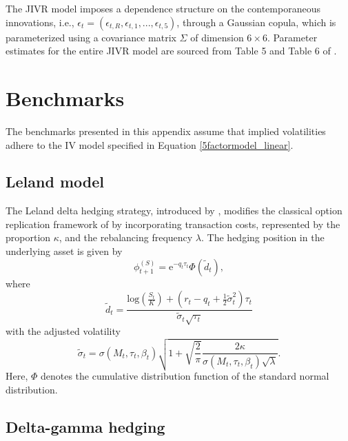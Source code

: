 \documentclass[12pt]{article}
\begin{document}
The JIVR model imposes a dependence structure on the contemporaneous innovations, i.e., \(\epsilon_t = (\epsilon_{t,R}, \epsilon_{t,1}, ..., \epsilon_{t,5})\), through a Gaussian copula, which is parameterized using a covariance matrix \(\Sigma\) of dimension \(6 \times 6\). Parameter estimates for the entire JIVR model are sourced from Table 5 and Table 6 of \cite{Frnacois2023}.

\section{Benchmarks}\label{appen:benchmarks}

The benchmarks presented in this appendix assume that implied volatilities adhere to the IV model specified in Equation \eqref{5factormodel_linear}.

\subsection{Leland model}\label{appen:Leland_model}

The Leland delta hedging strategy, introduced by \cite{Leland}, modifies the classical option replication framework of \cite{BlackScholes} by incorporating transaction costs, represented by the proportion $\kappa$, and the rebalancing frequency $\lambda$. The hedging position in the underlying asset is given by
\begin{equation*}
   \phi^{(S)}_{t+1} = \mbox{e}^{-q_{t}\tau_{t}}\Phi\left(\tilde{d}_{t} \right),
\end{equation*}
where
\begin{equation*}
\tilde{d}_{t} = \frac{\mbox{log}\left( \frac{S_{t}}{K} \right)+\left( r_{t}-q_{t}+\frac{1}{2}\tilde{\sigma}_{t}^2 \right)\tau_{t}}{\tilde{\sigma}_{t} \sqrt{\tau_{t}}}
\end{equation*}
with the adjusted volatility
\begin{equation*}
\tilde{\sigma}_{t} = \sigma (M_{t},\tau_{t},\beta_{t}) \sqrt{ 1+\sqrt{\frac{2}{\pi}} \frac{2\kappa}{\sigma (M_{t},\tau_{t},\beta_{t})\sqrt{\lambda}} }.
\end{equation*}
Here, $\Phi$ denotes the cumulative distribution function of the standard normal distribution.


\subsection{Delta-gamma hedging}\label{appen:delta_gamma}
\end{document}
